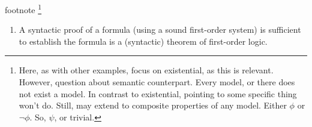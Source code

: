 \begin{note}

  {\color{red} footnote}\nolinebreak
  \footnote{
    Here, as with other examples, focus on existential, as this is relevant.
    However, question about semantic counterpart.
    Every model, or there does not exist a model.
    In contrast to existential, pointing to some specific thing won't do.
    Still, may extend to composite properties of any model.
    Either \(\phi\) or \(\lnot\phi\).
    So, \(\psi\), or trivial.
  }

  \begin{enumerate}[label=\named{\(\exists\mathord{\vdash}{,}\top\)}, ref=\named{\(\exists\mathord{\vdash}{,}\top\)}]
  \item\label{ill:Eproof:def} A syntactic proof of a formula (using a sound first-order system) is sufficient to establish the formula is a (syntactic) theorem of first-order logic.
  \end{enumerate}
\end{note}

